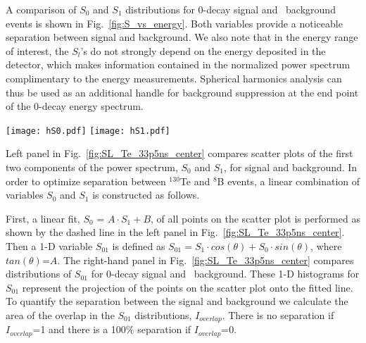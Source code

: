 A comparison of $S_0$ and $S_1$ distributions for 0\nbb-decay signal and \B~background events is shown in Fig.~\ref{fig:S_vs_energy}.
Both variables provide a noticeable separation between signal and background. We also note that in the energy range of interest, 
the $S_l$'s do not strongly depend on the energy deposited in the detector, which makes information contained in the normalized power 
spectrum complimentary to the energy measurements. Spherical harmonics analysis can thus be used as an additional handle for
background suppression at the end point of the 0\nbb-decay energy spectrum.

\begin{figure*}[h]
\centering
\texttt{[image: hS0.pdf]}
\texttt{[image: hS1.pdf]}
\caption{$S_0$ (\emph{left}) and $S_1$ (\emph{right}) distributions for 1000 simulated 0\nbb-decay signal and \B~background events.
  Two different isotopes are compared, $^{130}$Te and $^{82}$Se. Corresponding kinetic energies of \B~single electrons are
  2.53 MeV and 3.00 MeV. Central events assuming perfect reconstruction of vertex position. Time cut of 33.5~ns on the PE arrival time is
  applied. The default QE and 100\% photo-coverage is used in the simulation.}
\label{fig:S_vs_energy}
\end{figure*}

Left panel in Fig.~\ref{fig:SL_Te_33p5ns_center} compares scatter plots of the first two components of the power spectrum, 
$S_0$ and $S_1$, for signal and background. In order to optimize separation between $^{130}$Te and $^{8}$B
events, a linear combination of variables $S_0$ and $S_1$ is constructed as follows. 

First, a linear fit, $S_0$ = $A \cdot S_1 + B$, of all points on the scatter plot is performed as shown by the dashed 
line in the left panel in Fig.~\ref{fig:SL_Te_33p5ns_center}. Then a 1-D variable $S_{01}$ is defined as
$S_{01} = S_1 \cdot cos(\theta) + S_0 \cdot sin(\theta)$, where $tan(\theta)$=$A$. The right-hand panel in Fig.~\ref{fig:SL_Te_33p5ns_center}
compares distributions of $S_{01}$ for 0\nbb-decay signal and \B~background. These 1-D histograms for $S_{01}$ represent the
projection of the points on the scatter plot onto the fitted line. 
To quantify the separation between the signal and background we calculate the area of the overlap in the $S_{01}$ distributions, 
$I_{overlap}$. There is no separation if $I_{overlap}$=1 and there is a 100\% separation if $I_{overlap}$=0. 

